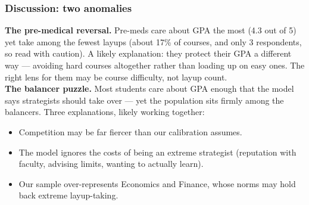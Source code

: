 \documentclass[xcolor=dvipsnames,11pt,table,aspectratio=169]{beamer}
\begin{document}
\begin{frame}
\frametitle{Discussion: two anomalies}
\small
\textbf{The pre-medical reversal.} Pre-meds care about GPA the most
(4.3 out of 5) yet take among the fewest layups (about 17\% of courses,
and only 3 respondents, so read with caution). A likely explanation:
they protect their GPA a different way --- avoiding hard courses
altogether rather than loading up on easy ones. The right lens for them
may be course difficulty, not layup count.\\[6pt]
\textbf{The balancer puzzle.} Most students care about GPA enough that
the model says strategists should take over --- yet the population sits
firmly among the balancers. Three explanations, likely working together:
\begin{itemize}
\itemsep2pt
\item Competition may be far fiercer than our calibration assumes.
\item The model ignores the costs of being an extreme strategist
      (reputation with faculty, advising limits, wanting to actually learn).
\item Our sample over-represents Economics and Finance, whose norms may
      hold back extreme layup-taking.
\end{itemize}
\end{frame}
\end{document}

